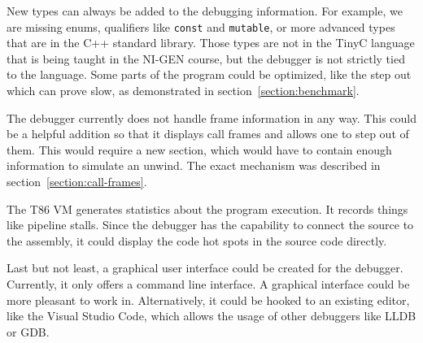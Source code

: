 New types can always be added to the debugging information. For example, we are
missing enums, qualifiers like \texttt{const} and \texttt{mutable}, or more
advanced types that are in the C++ standard library. Those types are not in the
TinyC language that is being taught in the NI-GEN course, but the debugger is
not strictly tied to the language. Some parts of the program could be
optimized, like the step out which can prove slow, as demonstrated in
section~\ref{section:benchmark}.

The debugger currently does not handle frame information in any way. This could
be a helpful addition so that it displays call frames and allows one to step
out of them. This would require a new section, which would have to contain
enough information to simulate an unwind. The exact mechanism was described in
section~\ref{section:call-frames}.

The T86 VM generates statistics about the program execution. It records things
like pipeline stalls. Since the debugger has the capability to connect the
source to the assembly, it could display the code hot spots in the source code
directly.

Last but not least, a graphical user interface could be created for the
debugger. Currently, it only offers a command line interface. A graphical
interface could be more pleasant to work in. Alternatively, it could be hooked
to an existing editor, like the Visual Studio Code, which allows the usage of
other debuggers like LLDB or GDB.
